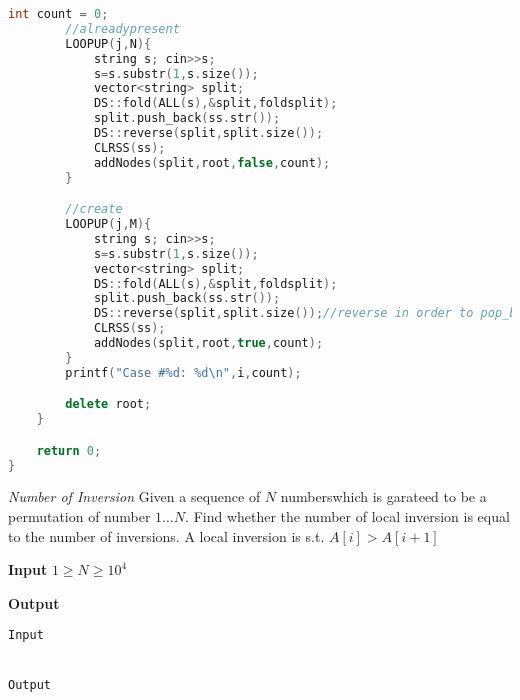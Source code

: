 \begin{solution}
\begin{lstlisting}[language=c++, caption="File fix it c++ solution"]
        int count = 0;
        //alreadypresent
        LOOPUP(j,N){
            string s; cin>>s;
            s=s.substr(1,s.size());
            vector<string> split;
            DS::fold(ALL(s),&split,foldsplit);
            split.push_back(ss.str());
            DS::reverse(split,split.size());
            CLRSS(ss);
            addNodes(split,root,false,count);
        }

        //create
        LOOPUP(j,M){
            string s; cin>>s;
            s=s.substr(1,s.size());
            vector<string> split;
            DS::fold(ALL(s),&split,foldsplit);
            split.push_back(ss.str());
            DS::reverse(split,split.size());//reverse in order to pop_back efficently
            CLRSS(ss);
            addNodes(split,root,true,count);
        }
        printf("Case #%d: %d\n",i,count);

        delete root;
    }

    return 0;
}

	\end{lstlisting}
\end{solution}

\begin{problem}{\textit{Number of Inversion}}
Given a sequence of $N$ numberswhich is garateed to be  a permutation of number $1 \ldots N$. Find whether the number of local inversion is equal to the number of inversions. A local inversion is s.t. $A[i] > A[i+1]$





\textbf{Input}
$1 \geq N \geq 10^4 $



\textbf{Output}


\begin{framed}
	\begin{verbatim}
Input 


Output 

	\end{verbatim}
\end{framed}

\end{problem}

\begin{solution}
	
	\begin{lstlisting}[language=c++, caption="Store credit c++ solution"]


	\end{lstlisting}
\end{solution}



